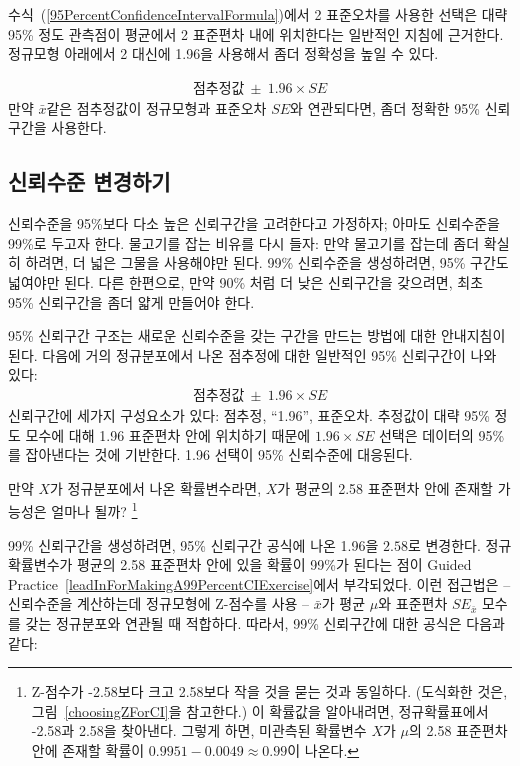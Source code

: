 수식~(\ref{95PercentConfidenceIntervalFormula})에서 2 표준오차를 사용한 선택은 대략 95\% 정도 관측점이 평균에서 2 표준편차 내에 위치한다는 일반적인 지침에 근거한다. 정규모형 아래에서 2 대신에 1.96을 사용해서 좀더 정확성을 높일 수 있다.

\begin{eqnarray}
\text{점추정값}\ \pm\ 1.96\times SE
\label{95PercentCIWhenUsingNormalModel}
\end{eqnarray}
만약 $\bar{x}$같은 점추정값이 정규모형과 표준오차 $SE$와 연관되다면, 좀더 정확한 95\% 신뢰구간을 사용한다.

\subsection{신뢰수준 변경하기}
\label{changingTheConfidenceLevelSection}


신뢰수준을 95\%보다 다소 높은 신뢰구간을 고려한다고 가정하자; 아마도 신뢰수준을 99\%로 두고자 한다. 물고기를 잡는 비유를 다시 들자: 만약 물고기를 잡는데 좀더 확실히 하려면, 더 넓은 그물을 사용해야만 된다. 99\% 신뢰수준을 생성하려면, 95\% 구간도 넓여야만 된다. 다른 한편으로, 만약 90\% 처럼 더 낮은 신뢰구간을 갖으려면, 최초 95\% 신뢰구간을 좀더 얇게 만들어야 한다. 

95\% 신뢰구간 구조는 새로운 신뢰수준을 갖는 구간을 만드는 방법에 대한 안내지침이 된다. 다음에 거의 정규분포에서 나온 점추정에 대한 일반적인 95\% 신뢰구간이 나와 있다:
\begin{eqnarray}
\text{점추정값}\ \pm\ 1.96\times SE
\end{eqnarray}
신뢰구간에 세가지 구성요소가 있다: 점추정, ``1.96'', 표준오차. 추정값이 대략 95\% 정도 모수에 대해 1.96 표준편차 안에 위치하기 때문에 $1.96\times SE$ 선택은 데이터의 95\%를 잡아낸다는 것에 기반한다. 1.96 선택이 95\% 신뢰수준에 대응된다.

\begin{exercise} \label{leadInForMakingA99PercentCIExercise}
만약 $X$가 정규분포에서 나온 확률변수라면, $X$가 평균의 2.58 표준편차 안에 존재할 가능성은 얼마나 될까?
\footnote{Z-점수가 -2.58보다 크고 2.58보다 작을 것을 묻는 것과 동일하다. (도식화한 것은, 그림~\ref{choosingZForCI}을 참고한다.) 이 확률값을 알아내려면, 정규확률표에서 -2.58과 2.58을 찾아낸다. 그렇게 하면, 미관측된 확률변수 $X$가 $\mu$의 2.58 표준편차 안에 존재할 확률이 $0.9951-0.0049 \approx 0.99$이 나온다.}
\end{exercise}

99\% 신뢰구간을 생성하려면, 95\% 신뢰구간 공식에 나온 1.96을 $2.58$로 변경한다. 정규확률변수가 평균의 2.58 표준편차 안에 있을 확률이 99\%가 된다는 점이 Guided Practice~\ref{leadInForMakingA99PercentCIExercise}에서 부각되었다. 이런 접근법은 -- 신뢰수준을 계산하는데 정규모형에 Z-점수를 사용 -- $\bar{x}$가 평균 $\mu$와 표준편차 $SE_{\bar{x}}$ 모수를 갖는 정규분포와 연관될 때 적합하다. 따라서, 99\% 신뢰구간에 대한 공식은 다음과 같다:

